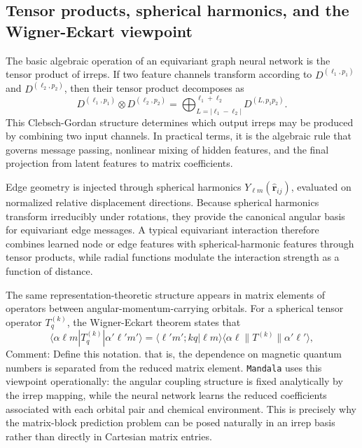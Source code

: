 \subsection{Tensor products, spherical harmonics, and the Wigner-Eckart viewpoint}
\label{subsec:tensor_products_background}

The basic algebraic operation of an equivariant graph neural network is the
tensor product of irreps. If two feature channels transform according to
$D^{(\ell_1,p_1)}$ and $D^{(\ell_2,p_2)}$, then their tensor product
decomposes as
\begin{equation}
D^{(\ell_1,p_1)} \otimes D^{(\ell_2,p_2)}
=
\bigoplus_{L=|\ell_1-\ell_2|}^{\ell_1+\ell_2}
D^{(L,p_1 p_2)}.
\end{equation}
This Clebsch-Gordan structure determines which output irreps may be produced by
combining two input channels. In practical terms, it is the algebraic rule that
governs message passing, nonlinear mixing of hidden features, and the final
projection from latent features to matrix coefficients.

Edge geometry is injected through spherical harmonics
$Y_{\ell m}(\hat{\bm{r}}_{ij})$, evaluated on normalized relative displacement
directions. Because spherical harmonics transform irreducibly under rotations,
they provide the canonical angular basis for equivariant edge messages. A
typical equivariant interaction therefore combines learned node or edge
features with spherical-harmonic features through tensor products, while radial
functions modulate the interaction strength as a function of distance.

The same representation-theoretic structure appears in matrix elements of
operators between angular-momentum-carrying orbitals. For a spherical tensor
operator $T^{(k)}_q$, the Wigner-Eckart theorem states that
\begin{equation}
\langle \alpha \ell m | T^{(k)}_q | \alpha' \ell' m' \rangle
=
\langle \ell' m'; k q | \ell m \rangle
\langle \alpha \ell \| T^{(k)} \| \alpha' \ell' \rangle,
\end{equation}
Comment: Define this notation.
that is, the dependence on magnetic quantum numbers is separated from the
reduced matrix element. \texttt{Mandala} uses this viewpoint operationally: the angular
coupling structure is fixed analytically by the irrep mapping, while the neural
network learns the reduced coefficients associated with each orbital pair and
chemical environment. This is precisely why the matrix-block prediction problem
can be posed naturally in an irrep basis rather than directly in Cartesian
matrix entries.
